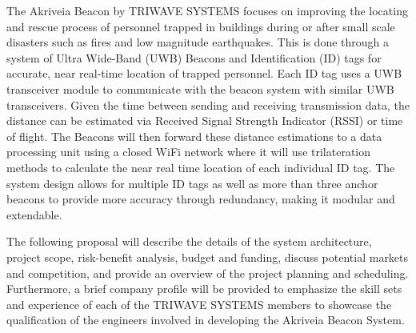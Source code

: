 \bigskip
The Akriveia Beacon by TRIWAVE SYSTEMS focuses on improving the locating and rescue process of personnel trapped in buildings during or after small scale disasters such as fires and low magnitude earthquakes. This is done through a system of Ultra Wide-Band (\Gls{UWB}) Beacons and Identification (\Gls{ID}) tags for accurate, near real-time location of trapped personnel. Each ID tag uses a UWB transceiver module to communicate with the beacon system with similar UWB transceivers. Given the time between sending and receiving transmission data, the distance can be estimated via Received Signal Strength Indicator (\Gls{RSSI}) or time of flight. The Beacons will then forward these distance estimations to a data processing unit using a closed WiFi network where it will use trilateration methods to calculate the near real time location of each individual ID tag. The system design allows for multiple ID tags as well as more than three anchor beacons to provide more accuracy through redundancy, making it modular and extendable.

\bigskip
The following proposal will describe the details of the system architecture, project scope, risk-benefit analysis, budget and funding, discuss potential markets and competition, and provide an overview of the project planning and scheduling. Furthermore, a brief company profile will be provided to emphasize the skill sets and experience of each of the TRIWAVE SYSTEMS members to showcase the qualification of the engineers involved in developing the Akriveia Beacon System. 
















